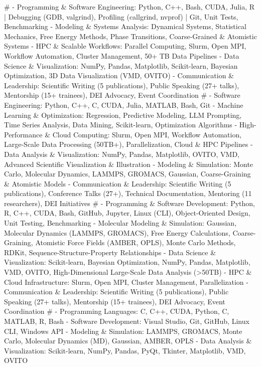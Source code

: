 #
- Programming \& Software Engineering: Python, C++, Bash, CUDA, Julia, R | Debugging (GDB, valgrind), Profiling (callgrind, nvprof) | Git, Unit Tests, Benchmarking
- Modeling \& Systems Analysis: Dynamical Systems, Statistical Mechanics, Free Energy Methods, Phase Transitions, Coarse-Grained \& Atomistic Systems
- HPC \& Scalable Workflows: Parallel Computing, Slurm, Open MPI, Workflow Automation, Cluster Management, 50+ TB Data Pipelines
- Data Science \& Visualization: NumPy, Pandas, Matplotlib, Scikit-learn, Bayesian Optimization, 3D Data Visualization (VMD, OVITO)
- Communication \& Leadership: Scientific Writing (5 publications), Public Speaking (27+ talks), Mentorship (15+ trainees), DEI Advocacy, Event Coordination
#
- Software Engineering: Python, C++, C, CUDA, Julia, MATLAB, Bash, Git
- Machine Learning \& Optimization: Regression, Predictive Modeling, LLM Prompting, Time Series Analysis, Data Mining, Scikit-learn, Optimization Algorithms
- High-Performance \& Cloud Computing: Slurm, Open MPI, Workflow Automation, Large-Scale Data Processing (50TB+), Parallelization, Cloud \& HPC Pipelines
- Data Analysis \& Visualization: NumPy, Pandas, Matplotlib, OVITO, VMD, Advanced Scientific Visualization \& Illustration
- Modeling \& Simulation: Monte Carlo, Molecular Dynamics, LAMMPS, GROMACS, Gaussian, Coarse-Graining \& Atomistic Models
- Communication \& Leadership: Scientific Writing (5 publications), Conference Talks (27+), Technical Documentation, Mentoring (11 researchers), DEI Initiatives
#
- Programming \& Software Development: Python, R, C++, CUDA, Bash, GitHub, Jupyter, Linux (CLI), Object-Oriented Design, Unit Testing, Benchmarking
- Molecular Modeling \& Simulation: Gaussian, Molecular Dynamics (LAMMPS, GROMACS), Free Energy Calculations, Coarse-Graining, Atomistic Force Fields (AMBER, OPLS), Monte Carlo Methods, RDKit, Sequence-Structure-Property Relationships
- Data Science \& Visualization: Scikit-learn, Bayesian Optimization, NumPy, Pandas, Matplotlib, VMD, OVITO, High-Dimensional Large-Scale Data Analysis (>50TB)
- HPC \& Cloud Infrastructure: Slurm, Open MPI, Cluster Management, Parallelization
- Communication \& Leadership: Scientific Writing (5 publications), Public Speaking (27+ talks), Mentorship (15+ trainees), DEI Advocacy, Event Coordination
#
- Programming Languages: C, C++, CUDA, Python, C, MATLAB, R, Bash
- Software Development: Visual Studio, Git, GitHub, Linux CLI, Windows API
- Modeling \& Simulation: LAMMPS, GROMACS, Monte Carlo, Molecular Dynamics (MD), Gaussian, AMBER, OPLS
- Data Analysis \& Visualization: Scikit-learn, NumPy, Pandas, PyQt, Tkinter, Matplotlib, VMD, OVITO
